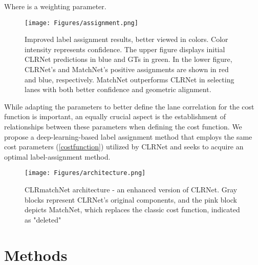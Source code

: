 \documentclass[10pt,twocolumn,letterpaper]{article}
\begin{document}
Where  is a weighting parameter.


\begin{figure}[t]
\begin{center}
   \texttt{[image: Figures/assignment.png]}
\caption{Improved label assignment results, better viewed in colors. Color intensity represents confidence. The upper figure displays initial CLRNet predictions in blue and GTs in green. In the lower figure, CLRNet's and MatchNet's positive assignments are shown in red and blue, respectively. MatchNet outperforms CLRNet in selecting lanes with both better confidence and geometric alignment.}
\end{center}
\label{assignment}
\end{figure}

While adapting the parameters to better define the lane correlation for the cost function is important, an equally crucial aspect is the establishment of relationships between these parameters when defining the cost function. We propose a deep-learning-based label assignment method that employs the same cost parameters (\ref{costfunction}) utilized by CLRNet and seeks to acquire an optimal label-assignment method.

\begin{figure*}
\begin{center}
    \texttt{[image: Figures/architecture.png]}
\caption{CLRmatchNet architecture - an enhanced version of CLRNet. Gray blocks represent CLRNet's original components, and the pink block depicts MatchNet, which replaces the classic cost function, indicated as "deleted"}
\label{CLRmatchNet}
\end{center}
\end{figure*}

\section{Methods} 
\end{document}
